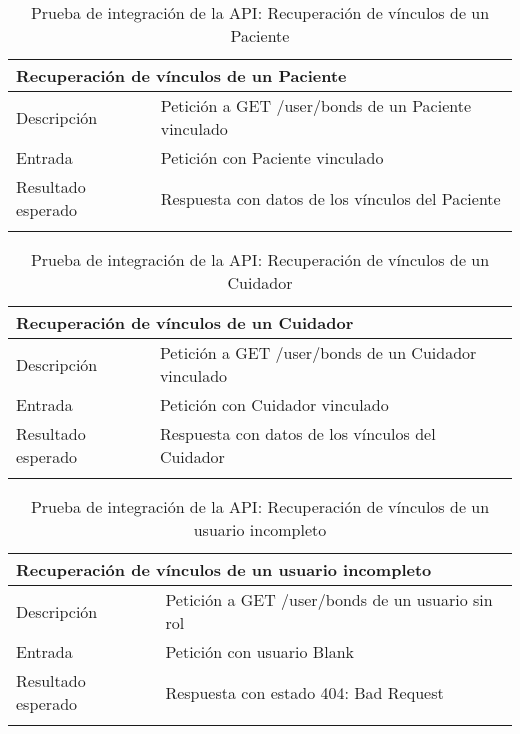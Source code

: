 \begin{longtable}{|p{} p{}|}
    \hline
    \multicolumn{2}{|l|}{\textbf{Recuperación de vínculos de un Paciente}} \\ \hline 
    Descripción                 & Petición a GET /user/bonds de un Paciente vinculado \\ \hline
    Entrada                     & Petición con Paciente vinculado \\  \hline
    Resultado esperado          & Respuesta con datos de los vínculos del Paciente \\ \hline
    \caption{Prueba de integración de la API: Recuperación de vínculos de un Paciente}
    \label{cp:i:api:recuperacion_vinculos_paciente}
\end{longtable}

\vspace{-10pt}
\begin{longtable}{|p{} p{}|}
    \hline
    \multicolumn{2}{|l|}{\textbf{Recuperación de vínculos de un Cuidador}} \\ \hline 
    Descripción                 & Petición a GET /user/bonds de un Cuidador vinculado \\ \hline
    Entrada                     & Petición con Cuidador vinculado \\  \hline
    Resultado esperado          & Respuesta con datos de los vínculos del Cuidador \\ \hline
    \caption{Prueba de integración de la API: Recuperación de vínculos de un Cuidador}
    \label{cp:i:api:recuperacion_vinculos_cuidador}
\end{longtable}

\vspace{-10pt}
\begin{longtable}{|p{} p{}|}
    \hline
    \multicolumn{2}{|l|}{\textbf{Recuperación de vínculos de un usuario incompleto}} \\ \hline 
    Descripción                 & Petición a GET /user/bonds de un usuario sin rol \\ \hline
    Entrada                     & Petición con usuario Blank \\  \hline
    Resultado esperado          & Respuesta con estado 404: Bad Request \\ \hline
    \caption{Prueba de integración de la API: Recuperación de vínculos de un usuario incompleto}
    \label{cp:i:api:recuperacion_vinculos_usuario_incompleto}
\end{longtable}

